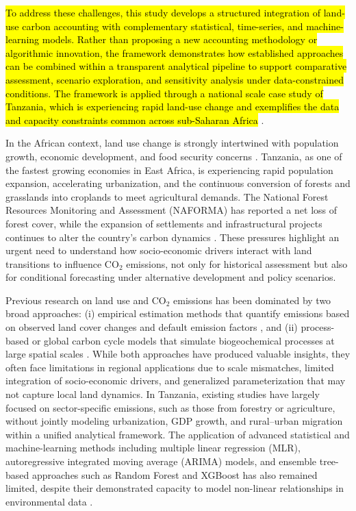 \documentclass[10pt,letterpaper]{article}
\begin{document}
\hl{To address these challenges, this study develops a structured integration of land-use carbon accounting with complementary statistical, time-series, and machine-learning models. Rather than proposing a new accounting methodology or algorithmic innovation, the framework demonstrates how established approaches can be combined within a transparent analytical pipeline to support comparative assessment, scenario exploration, and sensitivity analysis under data-constrained conditions. The framework is applied through a national scale case study of Tanzania, which is experiencing rapid land-use change and exemplifies the data and capacity constraints common across sub-Saharan Africa} \cite{sumari2020absurdity,olorunfemi2022dynamics,govender2022remote}.

In the African context, land use change is strongly intertwined with population growth, economic development, and food security concerns \cite{molotoks2021impacts}. Tanzania, as one of the fastest growing economies in East Africa, is experiencing rapid population expansion, accelerating urbanization, and the continuous conversion of forests and grasslands into croplands to meet agricultural demands. The National Forest Resources Monitoring and Assessment (NAFORMA) has reported a net loss of forest cover, while the expansion of settlements and infrastructural projects continues to alter the country’s carbon dynamics \cite{pandey2022challenges}. These pressures highlight an urgent need to understand how socio-economic drivers interact with land transitions to influence CO$_2$ emissions, not only for historical assessment but also for conditional forecasting under alternative development and policy scenarios.

Previous research on land use and CO$_2$ emissions has been dominated by two broad approaches: (i) empirical estimation methods that quantify emissions based on observed land cover changes and default emission factors \cite{gasser2020historical, obermeier2021modelled}, and (ii) process-based or global carbon cycle models that simulate biogeochemical processes at large spatial scales \cite{sun2023machine, chen2021five}. While both approaches have produced valuable insights, they often face limitations in regional applications due to scale mismatches, limited integration of socio-economic drivers, and generalized parameterization that may not capture local land dynamics. In Tanzania, existing studies have largely focused on sector-specific emissions, such as those from forestry or agriculture, without jointly modeling urbanization, GDP growth, and rural--urban migration within a unified analytical framework. The application of advanced statistical and machine-learning methods including multiple linear regression (MLR), autoregressive integrated moving average (ARIMA) models, and ensemble tree-based approaches such as Random Forest and XGBoost has also remained limited, despite their demonstrated capacity to model non-linear relationships in environmental data \cite{schmid2024statistical, mishra2024modeling}.
\end{document}
